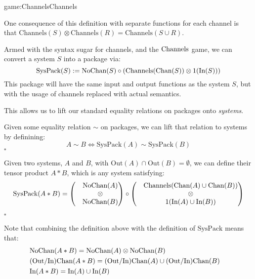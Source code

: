 \begin{game}{game:Channels}{Channels}
\end{game}

One consequence of this definition with separate functions for each channel
is that $\text{Channels}(S) \otimes \text{Channels}(R) = \text{Channels}(S \cup R)$.

Armed with the syntax sugar for channels, and the $\text{Channels}$ game,
we can convert a system $S$ into a package via:
$$
\text{SysPack}(S) := \text{NoChan}(S) \circ (\text{Channels}(\text{Chan}(S)) \otimes 1(\text{In}(S)))
$$
This package will have the same input and output functions as the system $S$,
but with the usage of channels replaced with actual semantics.

This allows us to lift our standard equality relations on packages onto
\emph{systems}.
\begin{definition}
Given some equality relation $\sim$ on packages, we can lift that relation
to systems by definining:
$$
A \sim B \iff \text{SysPack}(A) \sim \text{SysPack}(B)
$$
$\square$
\end{definition}

\begin{definition}
Given two systems, $A$ and $B$, with \(\text{Out}(A) \cap \text{Out}(B) = \emptyset\), we can define their tensor product $A * B$,
which is any system satisfying:
$$
\text{SysPack}(A * B) =
\begin{pmatrix}
&\text{NoChan}(A)\cr
&\otimes\cr
&\text{NoChan}(B)\cr
\end{pmatrix}
\circ
\begin{pmatrix}
&\text{Channels}(\text{Chan}(A) \cup \text{Chan}(B))\cr
&\otimes\cr
&1(\text{In}(A) \cup \text{In}(B))\cr
\end{pmatrix}
$$

$\square$
\end{definition}

Note that combining the definition above with the definition of $\text{SysPack}$
means that:
$$
\begin{aligned}
&\text{NoChan}(A * B) = \text{NoChan}(A) \otimes \text{NoChan}(B)\cr
&\text{(Out/In)Chan}(A * B) = \text{(Out/In)Chan}(A) \cup \text{(Out/In)Chan}(B)\cr
&\text{In}(A * B) = \text{In}(A) \cup \text{In}(B)\cr
\end{aligned}
$$

